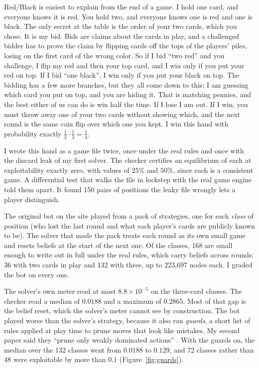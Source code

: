 \documentclass[11pt]{article}
\begin{document}
Red/Black is easiest to explain from the end of a game. I hold one card, and everyone knows it is
red. You hold two, and everyone knows one is red and one is black. The only secret at the table is
the order of your two cards, which you chose. It is my bid. Bids are claims about the cards in
play, and a challenged bidder has to prove the claim by flipping cards off the tops of the
players' piles, losing on the first card of the wrong color. So if I bid ``two red'' and you
challenge, I flip my red and then your top card, and I win only if you put your red on top. If I
bid ``one black'', I win only if you put your black on top. The bidding has a few more branches,
but they all come down to this: I am guessing which card you put on top, and you are hiding it.
That is matching pennies, and the best either of us can do is win half the time. If I lose I am
out. If I win, you must throw away one of your two cards without showing which, and the next round
is the same coin flip over which one you kept. I win this hand with probability exactly
$\tfrac12\cdot\tfrac12=\tfrac14$.

I wrote this hand as a game file twice, once under the real rules and once with the discard leak
of my first solver. The checker certifies an equilibrium of each at exploitability exactly zero,
with values of $25\%$ and $50\%$, since each is a consistent game. A differential test that walks the file in lockstep with the real game engine told them apart. It
found 150 pairs of positions the leaky file wrongly lets a player distinguish.

The original bot on the site played from a pack of strategies, one for each \emph{class} of
position (who lost the last round and what each player's cards are publicly known to be). The
solver that made the pack treats each round as its own small game and resets beliefs at the start
of the next one. Of the classes, 168 are small
enough to write out in full under the real rules, which carry beliefs across rounds: 36 with two
cards in play and 132 with three, up to 223,697 nodes each. I graded the bot on every one.

The solver's own meter read at most $8.8\times10^{-5}$ on the three-card classes. The checker read
a median of $0.0188$ and a maximum of $0.2865$. Most of that gap is the belief reset, which the
solver's meter cannot see by construction. The bot played worse than the solver's strategy, because it also ran \emph{guards}, a short list of rules applied at play
time to prune moves that look like mistakes. My second paper said they ``prune only weakly
dominated actions'' \cite{rb2}. With the guards on, the median over the 132 classes went from
$0.0188$ to $0.129$, and 72 classes rather than 48 were exploitable by more than $0.1$
(Figure~\ref{fig:guards}).
\end{document}
